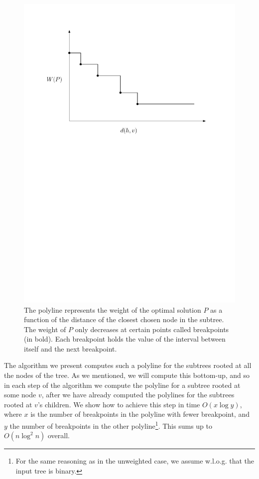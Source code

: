 \documentclass[11pt,a4paper]{article}
\theoremstyle{definition}
\theoremstyle{remark}
\begin{document}
\begin{figure}[h]
\begin{center}
\includegraphics[scale=0.4]{polyline}
\end{center}
\caption{The polyline represents the weight of the optimal solution $P$ as a function of the distance of the closest chosen node in the subtree. %
The weight of $P$ only decreases at certain points called breakpoints (in bold). Each breakpoint holds the value of the interval between itself and the next breakpoint.
\label{figure of a polyline}}
\end{figure}

The algorithm we present computes such a polyline for the subtrees rooted at all the nodes of the tree. As we mentioned, we will compute this bottom-up, and so in each step of the algorithm we compute the polyline for a subtree rooted at some node $v$, after we have already computed the polylines for the subtrees rooted at $v$'s children. We show how to achieve this step in time $O(x \log y)$, where $x$ is the number of breakpoints in the polyline with fewer breakpoint, and $y$ the number of breakpoints in the other polyline\footnote{For the same reasoning as in the unweighted case, we assume w.l.o.g. that the input tree is binary.}. This sums up to $O(n \log ^2 n)$ overall.
\end{document}
